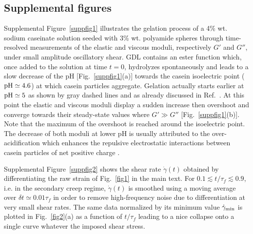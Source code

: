 \documentclass[twocolumn,superscriptaddress,showpacs,preprintnumbers,amsmath,amssymb,prl]{revtex4}
\newcommand\gp{\dot\gamma}
\begin{document}
\subsection*{Supplemental figures} 

Supplemental Figure~\ref{suppfig1} illustrates the gelation process of a 4\% wt. sodium caseinate solution seeded with 3\% wt. polyamide spheres through time-resolved measurements of the elastic and viscous moduli, respectively $G'$ and $G''$, under small amplitude oscillatory shear. GDL contains an ester function which, once added to the solution at time $t=0$, hydrolyzes spontaneously and leads to a slow decrease of the pH [Fig.~\ref{suppfig1}(a)] towards the casein isoelectric point (${\rm pH}\simeq 4.6$) at which casein particles aggregate. Gelation actually starts earlier at ${\rm pH}\simeq 5$ as shown by gray dashed lines and as already discussed in Ref.~\cite{Lucey:1998supp}. At this point the elastic and viscous moduli display a sudden increase then overshoot and converge towards their steady-state values where $G'\gg G''$ [Fig.~\ref{suppfig1}(b)]. Note that the maximum of the overshoot is reached around the isoelectric point. The decrease of both moduli at lower pH is usually attributed to the over-acidification which enhances the repulsive electrostatic interactions between casein particles of net positive charge \cite{Dickinson:2002supp}.   

Supplemental Figure~\ref{suppfig2} shows the shear rate $\gp(t)$ obtained by differentiating the raw strain of Fig.~\ref{fig1} in the main text. For $0.1\lesssim t/\tau_f\lesssim 0.9$, i.e. in the secondary creep regime, $\gp(t)$ is smoothed using a moving average over $\delta t\simeq 0.01\tau_f$ in order to remove high-frequency noise due to differentiation at very small shear rates. The same data normalized by its minimum value $\gp_{\rm min}$ is plotted in Fig.~\ref{fig2}(a) as a function of $t/\tau_f$ leading to a nice collapse onto a single curve whatever the imposed shear stress.
\end{document}
